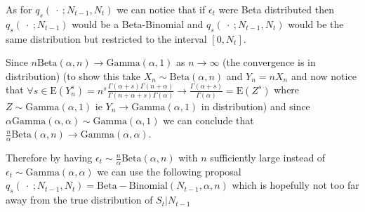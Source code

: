 \documentclass{article}
\begin{document}
	As for $q_s(\ \cdot \ ; N_{t-1}, N_t)$ we can notice that if $\epsilon_t$ were Beta distributed then $q_s(\ \cdot \ ; N_{t-1})$ would be a Beta-Binomial and $q_s(\ \cdot \ ; N_{t-1}, N_t)$ would be the same distribution but restricted to the interval $[0, N_t]$. 
	
	Since $n\mathrm{Beta}(\alpha, n) \rightarrow \mathrm{Gamma}(\alpha, 1)$ as $n \rightarrow \infty$ (the convergence is in distribution) (to show this take $X_n \sim \mathrm{Beta}(\alpha, n)$ and $Y_n = nX_n$ and now notice that $\forall s \in \mathrm{E}(Y_n^s) = n^s\frac{\Gamma(\alpha+s)\Gamma(n+\alpha)}{\Gamma(n+\alpha+s)\Gamma(\alpha)} \rightarrow \frac{\Gamma(\alpha+s)}{\Gamma(\alpha)} = \mathrm{E}(Z^s)$ where $Z \sim \mathrm{Gamma}(\alpha, 1)$ ie $Y_n \rightarrow \mathrm{Gamma}(\alpha, 1)$ in distribution) and since $\alpha\mathrm{Gamma(\alpha, \alpha) \sim \mathrm{Gamma}(\alpha, 1)}$ we can conclude that $\frac{n}{\alpha}\mathrm{Beta}(\alpha, n) \rightarrow \mathrm{Gamma}(\alpha, \alpha)$. 
	
	Therefore by having $\epsilon_t \sim \frac{n}{\alpha}\mathrm{Beta}(\alpha, n)$ with $n$ sufficiently large instead of $\epsilon_t \sim \mathrm{Gamma}(\alpha, \alpha)$ we can use the following proposal $q_s(\ \cdot \ ; N_{t-1}, N_t) = \mathrm{Beta-Binomial}(N_{t-1}, \alpha, n)$ which is hopefully not too far away from the true distribution of $S_t | N_{t-1}$
\end{document}
